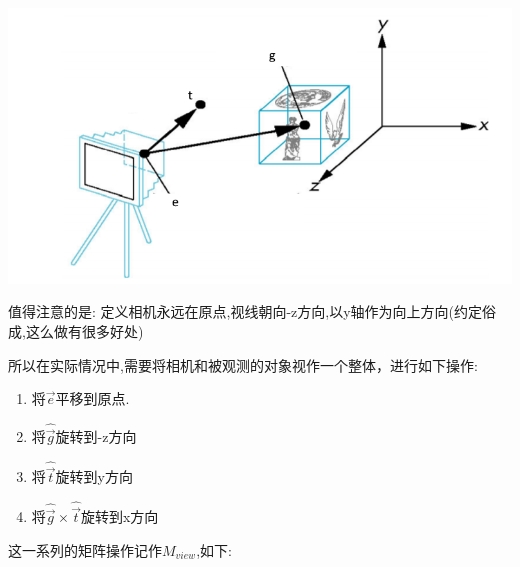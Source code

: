 \documentclass[UTF8,12pt]{ctexbook}
\begin{document}
{{{{{\begin{itemize}
{                \includegraphics[scale=0.9]{resources/viewTransformation.png}

                值得注意的是: 定义相机永远在原点,视线朝向-z方向,以y轴作为向上方向(约定俗成,这么做有很多好处)

                所以在实际情况中,需要将相机和被观测的对象视作一个整体，进行如下操作:
                \begin{enumerate}
                  \item 将$\vec{e}$平移到原点.
                  \item 将$\hat{\vec{g}}$旋转到-z方向
                  \item 将$\hat{\vec{t}}$旋转到y方向
                  \item 将$\hat{\vec{g}} \times \hat{\vec{t}}$旋转到x方向
                \end{enumerate}

                这一系列的矩阵操作记作$M_{view}$,如下:

}
\end{itemize}}}}}}
\end{document}
